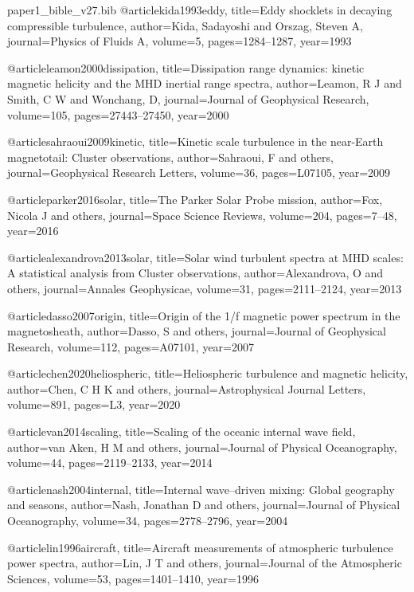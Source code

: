 \begin{filecontents}[overwrite]{paper1_bible_v27.bib}
@article{kida1993eddy,
  title={Eddy shocklets in decaying compressible turbulence},
  author={Kida, Sadayoshi and Orszag, Steven A},
  journal={Physics of Fluids A},
  volume={5},
  pages={1284--1287},
  year={1993}
}

@article{leamon2000dissipation,
  title={Dissipation range dynamics: kinetic magnetic helicity and the {M}HD inertial range spectra},
  author={Leamon, R J and Smith, C W and Wonchang, D},
  journal={Journal of Geophysical Research},
  volume={105},
  pages={27443--27450},
  year={2000}
}

@article{sahraoui2009kinetic,
  title={Kinetic scale turbulence in the near-{E}arth magnetotail: {C}luster observations},
  author={Sahraoui, F and others},
  journal={Geophysical Research Letters},
  volume={36},
  pages={L07105},
  year={2009}
}

@article{parker2016solar,
  title={The {P}arker {S}olar {P}robe mission},
  author={Fox, Nicola J and others},
  journal={Space Science Reviews},
  volume={204},
  pages={7--48},
  year={2016}
}

@article{alexandrova2013solar,
  title={Solar wind turbulent spectra at {MHD} scales: {A} statistical analysis from {C}luster observations},
  author={Alexandrova, O and others},
  journal={Annales Geophysicae},
  volume={31},
  pages={2111--2124},
  year={2013}
}

@article{dasso2007origin,
  title={Origin of the 1/f magnetic power spectrum in the magnetosheath},
  author={Dasso, S and others},
  journal={Journal of Geophysical Research},
  volume={112},
  pages={A07101},
  year={2007}
}

@article{chen2020heliospheric,
  title={Heliospheric turbulence and magnetic helicity},
  author={Chen, C H K and others},
  journal={Astrophysical Journal Letters},
  volume={891},
  pages={L3},
  year={2020}
}

@article{van2014scaling,
  title={Scaling of the oceanic internal wave field},
  author={van Aken, H M and others},
  journal={Journal of Physical Oceanography},
  volume={44},
  pages={2119--2133},
  year={2014}
}

@article{nash2004internal,
  title={Internal wave--driven mixing: {G}lobal geography and seasons},
  author={Nash, Jonathan D and others},
  journal={Journal of Physical Oceanography},
  volume={34},
  pages={2778--2796},
  year={2004}
}

@article{lin1996aircraft,
  title={Aircraft measurements of atmospheric turbulence power spectra},
  author={Lin, J T and others},
  journal={Journal of the Atmospheric Sciences},
  volume={53},
  pages={1401--1410},
  year={1996}
}


\end{filecontents}
